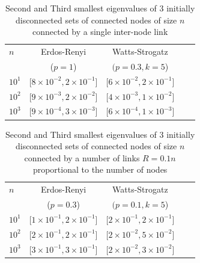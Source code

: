 \documentclass{article}
\begin{document}
\begin{table}[t]
	\caption{Second and Third smallest eigenvalues of 3 initially disconnected sets of connected nodes of size $n$ connected by a single inter-node link}\label{table1}
	\begin{center}
		\begin{small}
			\begin{sc}
				\begin{tabular}{lcccr}
					\toprule
					$n$ & Erdos-Renyi & Watts-Strogatz  \\
					& ($p=1$) & $(p=0.3,k=5$)  \\
					\midrule
					$10^{1}$    & [$8\times 10^{-2},2\times 10^{-1}$]& [$6\times 10^{-2},2\times 10^{-1}$]  \\
					$10^{2}$ & [$9\times 10^{-3},2\times 10^{-2}$]& [$4\times 10^{-3},1\times 10^{-2}$]\\
					$10^{3}$    & [$9\times 10^{-4},3\times 10^{-3}$]& [$6\times 10^{-4},1\times 10^{-3}$] \\
					\bottomrule
				\end{tabular}
			\end{sc}
		\end{small}
	\end{center}
	\vskip -0.1in
\end{table}



\begin{table}[t]
\caption{Second and Third smallest eigenvalues of 3 initially disconnected sets of connected nodes of size $n$ connected by a number of links $R=0.1n$ proportional to the number of nodes}	\label{table2}
	\begin{center}
		\begin{small}
			\begin{sc}
				\begin{tabular}{lcccr}
					\toprule
					$n$ & Erdos-Renyi  & Watts-Strogatz  \\
					& ($p=0.3$) & $(p=0.1,k=5$)  \\
					\midrule
					$10^{1}$    & [$1\times 10^{-1},2\times 10^{-1}$]& [$2\times 10^{-1},2\times 10^{-1}$]  \\
					$10^{2}$ & [$2\times 10^{-1},2\times 10^{-1}$]& [$2\times 10^{-2},5\times 10^{-2}$]\\
					$10^{3}$    & [$3\times 10^{-1},3\times 10^{-1}$]& [$2\times 10^{-2},3\times 10^{-2}$] \\
					\bottomrule
				\end{tabular}
			\end{sc}
		\end{small}
	\end{center}
	\vskip -0.1in
\end{table}
\end{document}
